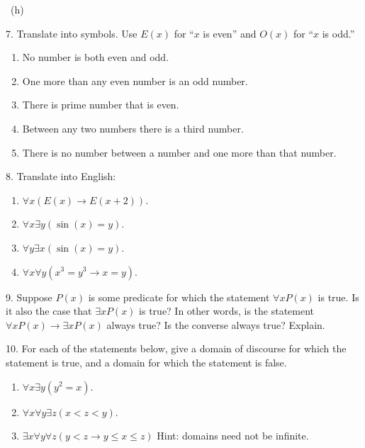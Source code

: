 \documentclass[10pt,]{book}
\theoremstyle{plain}
\theoremstyle{definition}
\theoremstyle{definition}
\theoremstyle{definition}
\numberwithin{equation}{chapter}
\def\imp{\rightarrow}
\newcommand{\lt}{<}
\begin{document}
\begin{exerciselist}
\par\smallskip
~{\tiny (h)}\item[7.]\hypertarget{exercise-62}{}\hypertarget{p-1908}{}%
Translate into symbols. Use \(E(x)\) for ``\(x\) is even'' and \(O(x)\) for ``\(x\) is odd.''%
\leavevmode%
\begin{enumerate}[label=(\alph*)]
\item\hypertarget{li-216}{}\hypertarget{p-1909}{}%
No number is both even and odd.%
\item\hypertarget{li-217}{}\hypertarget{p-1910}{}%
One more than any even number is an odd number.%
\item\hypertarget{li-218}{}\hypertarget{p-1911}{}%
There is prime number that is even.%
\item\hypertarget{li-219}{}\hypertarget{p-1912}{}%
Between any two numbers there is a third number.%
\item\hypertarget{li-220}{}\hypertarget{p-1913}{}%
There is no number between a number and one more than that number.%
\end{enumerate}
\par\smallskip
\item[8.]\hypertarget{exercise-63}{}\hypertarget{p-1915}{}%
Translate into English: \leavevmode%
\begin{enumerate}[label=(\alph*)]
\item\hypertarget{li-226}{}\(\forall x (E(x) \imp E(x +2))\).%
\item\hypertarget{li-227}{}\(\forall x \exists y (\sin(x) = y)\).%
\item\hypertarget{li-228}{}\(\forall y \exists x (\sin(x) = y)\).%
\item\hypertarget{li-229}{}\(\forall x \forall y (x^3 = y^3 \imp x = y)\).%
\end{enumerate}
%
\par\smallskip
\item[9.]\hypertarget{exercise-64}{}\hypertarget{p-1921}{}%
Suppose \(P(x)\) is some predicate for which the statement \(\forall x P(x)\) is true. Is it also the case that \(\exists x P(x)\) is true? In other words, is the statement \(\forall x P(x) \imp \exists x P(x)\) always true? Is the converse always true? Explain.%
\par\smallskip
\item[10.]\hypertarget{exercise-65}{}\hypertarget{p-1922}{}%
For each of the statements below, give a domain of discourse for which the statement is true, and a domain for which the statement is false.%
\par
\hypertarget{p-1923}{}%
\leavevmode%
\begin{enumerate}[label=(\alph*)]
\item\hypertarget{li-234}{}\(\forall x \exists y (y^2 = x)\).%
\item\hypertarget{li-235}{}\(\forall x \forall y \exists z (x \lt  z \lt  y)\).%
\item\hypertarget{li-236}{}\(\exists x \forall y \forall z (y \lt  z \imp y \le x \le z)\) Hint: domains need not be infinite.%
\end{enumerate}
%
\par\smallskip
\end{exerciselist}
\end{document}
